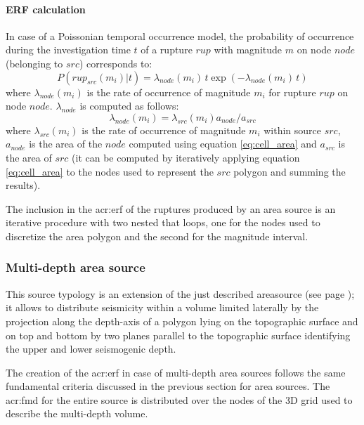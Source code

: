 \paragraph{ERF calculation}
\label{par:erf_calc_area_src}
In case of a Poissonian temporal occurrence model, the probability of 
occurrence during the investigation time $t$ of a rupture $rup$ with 
magnitude $m$ on node $node$ (belonging to $src$) corresponds to:
\begin{equation}
P(rup_{src}(m_i)|t)=\lambda_{node}(m_i)\,t\exp(-\lambda_{node}(m_i)\,t)
\end{equation}
where $\lambda_{node}(m_i)$ is the rate of occurrence of magnitude $m_i$ 
for rupture $rup$ on node $node$. $\lambda_{node}$ is computed as follows:
\[ 
\lambda_{node}(m_i) = \lambda_{src}(m_i)a_{node}/a_{src}
\]
%
where $\lambda_{src}(m_i)$ is the rate of occurrence of magnitude $m_i$
within source $src$, $a_{node}$ is the area of the $node$ computed using
equation \ref{eq:cell_area} and $a_{src}$ is the area of $src$ (it can be
computed by iteratively applying equation \ref{eq:cell_area} to the 
nodes used to represent the $src$ polygon and summing the results). 

The inclusion in the \gls{acr:erf} of the ruptures produced by an 
area source is an iterative procedure with two nested that loops, one 
for the nodes used to discretize the area polygon and the second for 
the magnitude interval. 
%
\subsubsection{Multi-depth area source}
%
%
This source typology is an extension of the just described 
\gls{areasource} (see page \pageref{sec:areasource});
it allows to distribute seismicity within a volume limited 
laterally by the projection along the depth-axis of a polygon 
lying on the topographic surface and on top and bottom by 
two planes parallel to the topographic surface identifying the 
upper and lower seismogenic depth.

The creation of the \gls{acr:erf} in case of multi-depth area sources
follows the same fundamental criteria discussed in the previous section 
for area sources. 
%
The \gls{acr:fmd} for the entire source is distributed over the nodes 
of the 3D grid used to describe the multi-depth volume.
%
